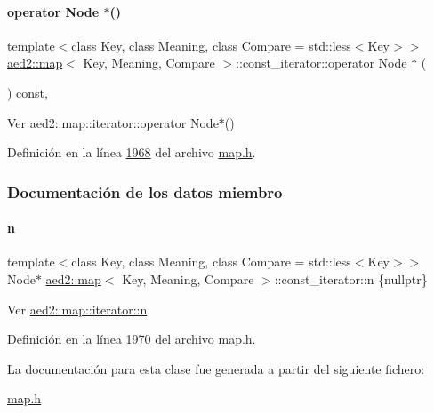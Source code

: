 \paragraph{\texorpdfstring{operator Node $\ast$()}{operator Node *()}}
{\footnotesize\ttfamily template$<$class Key, class Meaning, class Compare = std\+::less$<$\+Key$>$$>$ \\
\hyperlink{classaed2_1_1map}{aed2\+::map}$<$ Key, Meaning, Compare $>$\+::const\+\_\+iterator\+::operator Node $\ast$ (\begin{DoxyParamCaption}{ }\end{DoxyParamCaption}) const\hspace{0.3cm}{\ttfamily [inline]}, {\ttfamily [private]}}



Ver aed2\+::map\+::iterator\+::operator Node$\ast$() 



Definición en la línea \hyperlink{map_8h_source_l01968}{1968} del archivo \hyperlink{map_8h_source}{map.\+h}.



\subsubsection{Documentación de los datos miembro}
\mbox{\label{classaed2_1_1map_1_1const__iterator_a921e123f9c7f94610cf9fee3ab55d277_a921e123f9c7f94610cf9fee3ab55d277}} 
\paragraph{\texorpdfstring{n}{n}}
{\footnotesize\ttfamily template$<$class Key, class Meaning, class Compare = std\+::less$<$\+Key$>$$>$ \\
Node$\ast$ \hyperlink{classaed2_1_1map}{aed2\+::map}$<$ Key, Meaning, Compare $>$\+::const\+\_\+iterator\+::n \{nullptr\}\hspace{0.3cm}{\ttfamily [private]}}



Ver \hyperlink{classaed2_1_1map_1_1iterator_adf8633ef71bb6c1fc01c0abe8728fd93_adf8633ef71bb6c1fc01c0abe8728fd93}{aed2\+::map\+::iterator\+::n}. 



Definición en la línea \hyperlink{map_8h_source_l01970}{1970} del archivo \hyperlink{map_8h_source}{map.\+h}.



La documentación para esta clase fue generada a partir del siguiente fichero\+:\begin{DoxyCompactItemize}
\item 
\hyperlink{map_8h}{map.\+h}\end{DoxyCompactItemize}
